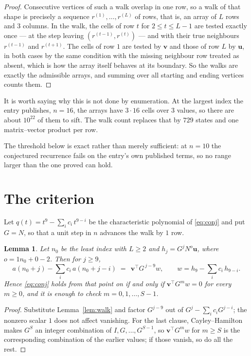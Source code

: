 \documentclass[11pt,a4paper]{article}
\theoremstyle{plain}
\newtheorem{lemma}[theorem]{Lemma}
\theoremstyle{definition}
\begin{document}
\begin{proof}
Consecutive vertices of such a walk overlap in one row, so a walk of that shape is
precisely a sequence $r^{(1)},\dots,r^{(L)}$ of rows, that is, an array of $L$ rows
and $3$ columns. In the walk, the cells of row $t$ for $2\le t\le L-1$ are tested
exactly once --- at the step leaving $(r^{(t-1)},r^{(t)})$ --- and with their true
neighbours $r^{(t-1)}$ and $r^{(t+1)}$. The cells of row $1$ are tested by
$\mathbf{v}$ and those of row $L$ by $\mathbf{u}$, in both cases by the same condition
with the missing neighbour row treated as absent, which is how the array itself behaves at
its boundary. So the walks are exactly the admissible arrays, and summing over all starting
and ending vertices counts them.
\end{proof}


It is worth saying why this is not done by enumeration. At the largest index the entry
publishes, $n=16$, the arrays have $3\cdot16$ cells over
$3$ values, so there are about $10^{22}$ of them to sift. The
walk count replaces that by $729$ states and one matrix--vector product per row.

The threshold below is exact rather than merely sufficient: at $n=10$ the conjectured
recurrence fails on the entry's own published terms, so no range larger than the one proved
can hold.
\section{The criterion}

Let $q(t)=t^{9}-\sum_i c_i\,t^{9-i}$ be the characteristic polynomial of
\eqref{eq:conj} and put $G=N$, so that a unit step in $n$ advances the walk by
$1$ row.

\begin{lemma}\label{lem:crit}
Let $n_0$ be the least index with $L\ge2$ and $h_j=G^{j}N^{o}\mathbf{u}$, where
$o=1n_0+0-2$. Then for $j\ge9$,
\[
a(n_0+j)-\sum_i c_i\,a(n_0+j-i)\;=\;\,\mathbf{v}^{\!\top}G^{\,j-9}w,
\qquad w=h_{9}-\sum_i c_i\,h_{9-i} .
\]
Hence \eqref{eq:conj} holds from that point on if and only if
$\mathbf{v}^{\!\top}G^{m}w=0$ for every $m\ge0$, and it is enough to check
$m=0,1,\dots,S-1$.
\end{lemma}

\begin{proof}
Substitute Lemma~\ref{lem:walk} and factor $G^{j-9}$ out of
$G^{j}-\sum_ic_iG^{j-i}$; the nonzero scalar $1$ does not affect
vanishing. For the last clause, Cayley--Hamilton makes $G^{S}$ an integer combination of
$I,G,\dots,G^{S-1}$, so $\mathbf{v}^{\!\top}G^{m}w$ for $m\ge S$ is the corresponding
combination of the earlier values; if those vanish, so do all the rest.
\end{proof}
\end{document}

